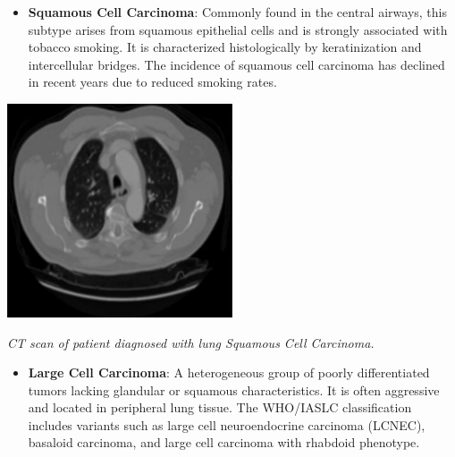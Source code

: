 \begin{itemize}
    \item \textbf{Squamous Cell Carcinoma}: Commonly found in the central airways, this subtype 
    arises from squamous epithelial cells and is strongly associated with tobacco smoking. It is 
    characterized histologically by keratinization and intercellular bridges. The incidence of 
    squamous cell carcinoma has declined in recent years due to reduced smoking rates. 
    \cite{nlm2025}
\end{itemize}

\vspace{1em}
\begin{center}
    \includegraphics[width=0.5\textwidth]{../assets/01-overview/lc-scc-ct.jpg}

    \small\textit{CT scan of patient diagnosed with lung Squamous Cell Carcinoma. 
    \cite{SHATNAWI2025100188}}
\end{center}
\vspace{1em}

\begin{itemize}
    \item \textbf{Large Cell Carcinoma}: A heterogeneous group of poorly differentiated tumors 
    lacking glandular or squamous characteristics. It is often aggressive and located in peripheral 
    lung tissue. The WHO/IASLC classification includes variants such as large cell neuroendocrine 
    carcinoma (LCNEC), basaloid carcinoma, and large cell carcinoma with rhabdoid phenotype. 
    \cite{nlm2025}
\end{itemize}

